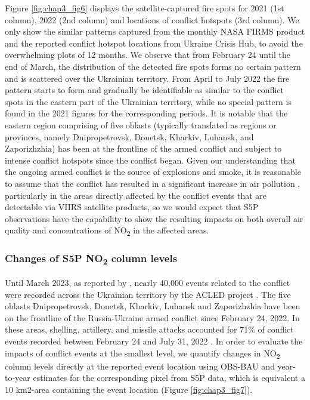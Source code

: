 Figure \ref{fig:chap3_fig6} displays the satellite-captured fire spots for 2021 (1st column), 2022 (2nd column) and locations of conflict hotspots (3rd column). We only show the similar patterns captured from the monthly NASA FIRMS product and the reported conflict hotspot locations from Ukraine Crisis Hub, to avoid the overwhelming plots of 12 months. We observe that from February 24 until the end of March, the distribution of the detected fire spots forms no certain pattern and is scattered over the Ukrainian territory. From April to July 2022 the fire pattern starts to form and gradually be identifiable as similar to the conflict spots in the eastern part of the Ukrainian territory, while no special pattern is found in the 2021 figures for the corresponding periods. It is notable that the eastern region comprising of five oblasts (typically translated as regions or provinces, namely Dnipropetrovsk, Donetsk, Kharkiv, Luhansk, and Zaporizhzhia) has been at the frontline of the armed conflict and subject to intense conflict hotspots since the conflict began. Given our understanding that the ongoing armed conflict is the source of explosions and smoke, it is reasonable to assume that the conflict has resulted in a significant increase in air pollution \citep{pereira2022russian}, particularly in the areas directly affected by the conflict events that are detectable via VIIRS satellite products, so we would expect that S5P observations have the capability to show the resulting impacts on both overall air quality and concentrations of NO\textsubscript{2} in the affected areas.\par
\subsubsection*{Changes of S5P NO\textsubscript{2} column levels}
Until March 2023, as reported by \citep{nichita2023}, nearly 40,000 events related to the conflict were recorded across the Ukrainian territory by the ACLED project \citep{raleigh2010introducing}. The five oblasts Dnipropetrovsk, Donetsk, Kharkiv, Luhansk and Zaporizhzhia have been on the frontline of the Russia-Ukraine armed conflict since February 24, 2022. In these areas, shelling, artillery, and missile attacks accounted for 71\% of conflict events recorded between February 24 and July 31, 2022 \citep{nichita2023}. In order to evaluate the impacts of conflict events at the smallest level, we quantify changes in NO\textsubscript{2} column levels directly at the reported event location using OBS-BAU and year-to-year estimates for the corresponding pixel from S5P data, which is equivalent a 10 km2-area containing the event location (Figure \ref{fig:chap3_fig7}). \par


